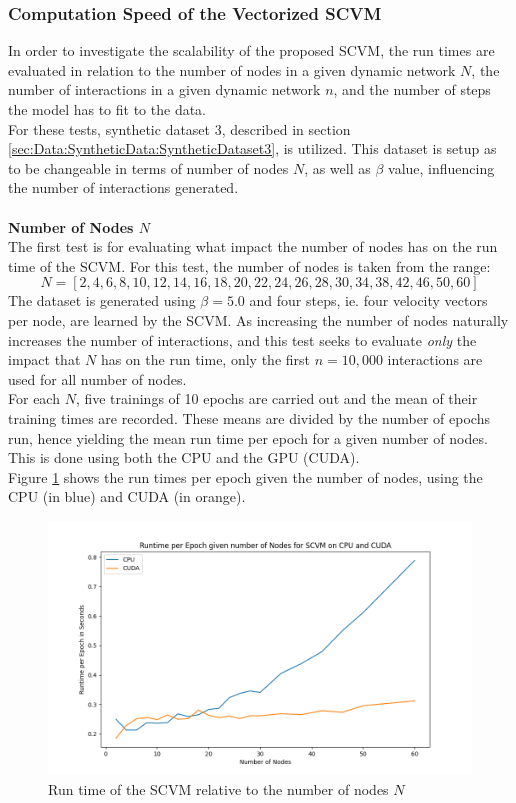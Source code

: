 \subsubsection{Computation Speed of the Vectorized SCVM}
\label{sec:ResearchQuestion2:ComputationSpeed}
In order to investigate the scalability of the proposed SCVM, the run times are evaluated in relation to the number of nodes in a given dynamic network $N$, the number of interactions in a given dynamic network $n$, and the number of steps the model has to fit to the data.
\\
For these tests, synthetic dataset 3, described in section \ref{sec:Data:SyntheticData:SyntheticDataset3}, is utilized.
This dataset is setup as to be changeable in terms of number of nodes $N$, as well as $\beta$ value, influencing the number of interactions generated.
\\\\
\textbf{Number of Nodes $N$}
\\
The first test is for evaluating what impact the number of nodes has on the run time of the SCVM.
For this test, the number of nodes is taken from the range:
\begin{equation*}
    N = [2, 4, 6, 8, 10, 12, 14, 16, 18, 20, 22, 24, 26, 28, 30, 34, 38, 42, 46, 50, 60]
\end{equation*}
The dataset is generated using $\beta = 5.0$ and four steps, ie. four velocity vectors per node, are learned by the SCVM.
As increasing the number of nodes naturally increases the number of interactions, and this test seeks to evaluate \textit{only} the impact that $N$ has on the run time, only the first $n = 10,000$ interactions are used for all number of nodes.
\\
For each $N$, five trainings of 10 epochs are carried out and the mean of their training times are recorded.
These means are divided by the number of epochs run, hence yielding the mean run time per epoch for a given number of nodes.
This is done using both the CPU and the GPU (CUDA).
\\
Figure \ref{fig:NumNodesRuntimes} shows the run times per epoch given the number of nodes, using the CPU (in blue) and CUDA (in orange).
\begin{figure}[H]
    \centering
    \includegraphics[width=\textwidth]{0_images/numnodes_runtime2.png}
    \caption{Run time of the SCVM relative to the number of nodes $N$}
    \label{fig:NumNodesRuntimes}
\end{figure}
